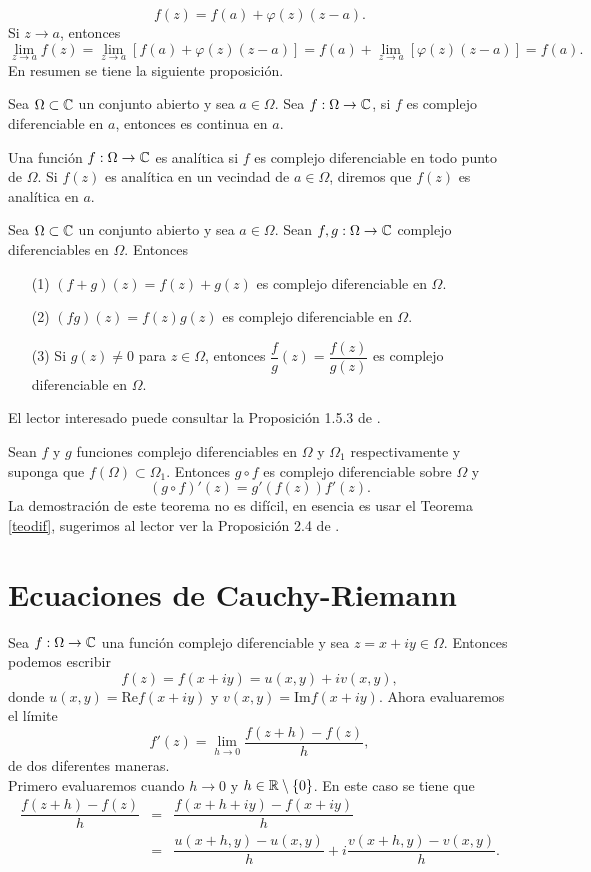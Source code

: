$$f(z)=f(a)+\varphi(z)(z-a).$$
Si $z\rightarrow a$, entonces 
$$\lim_{z\rightarrow a}f(z)=\lim_{z\rightarrow a}\left[f(a)+\varphi(z)(z-a)\right]=f(a)+\lim_{z\rightarrow a}[\varphi(z)(z-a)]=f(a).$$
En resumen se tiene la siguiente proposición.
\begin{prop}
	Sea $\Omega\subset \mathbb{C}$ un conjunto abierto y sea $a \in \Omega$. Sea $f:\Omega\rightarrow\mathbb{C}$, si $f$ es complejo diferenciable en $a$, entonces es continua en $a$.
\end{prop}
\begin{defi}
	Una función $f:\Omega\rightarrow\mathbb{C}$ es analítica si $f$ es complejo diferenciable en todo punto de  $\Omega$. Si $f(z)$ es analítica en un vecindad de $a\in \Omega$, diremos que $f(z)$ es analítica en $a$.
\end{defi}

\begin{prop}
	Sea $\Omega\subset \mathbb{C}$ un conjunto abierto y sea $a \in \Omega$. Sean $f,g:\Omega\rightarrow\mathbb{C}$ complejo diferenciables en $\Omega$. Entonces 
	\begin{itemize}
		\item [(1)] $(f+g)(z)=f(z)+g(z)$ es complejo diferenciable en $\Omega$.
		\item [(2)] $(fg)(z)=f(z)g(z)$ es complejo diferenciable en $\Omega$.
		\item [(3)] Si $g(z)\neq 0$ para $z\in\Omega$, entonces $\dfrac{f}{g}(z) = \dfrac{f(z)}{g(z)}$ es complejo diferenciable en $\Omega$.
	\end{itemize} 
\end{prop}
El lector interesado puede consultar la Proposición 1.5.3 de \cite{marsden}. 
\begin{teor}
	Sean $f$ y $g$ funciones complejo diferenciables en $\Omega$ y $\Omega_{1}$ respectivamente y suponga que $f(\Omega)\subset\Omega_{1}$. Entonces $g\circ f$ es complejo diferenciable sobre $\Omega$ y 
	$$(g\circ f)'(z)=g'(f(z))f'(z).$$
	La demostración de este teorema no es difícil, en esencia es usar el Teorema \ref{teodif}, sugerimos al lector ver la Proposición 2.4 de \cite{Conway}.


\end{teor}
\section{Ecuaciones de Cauchy-Riemann} \label{sec:Cauchy-Riemann}

Sea $f:\Omega\rightarrow\mathbb{C}$ una función complejo diferenciable y sea $z=x+iy\in \Omega$. Entonces podemos escribir
$$f(z)=f(x+iy)=u(x,y)+iv(x,y),$$
donde $u(x,y)=\mathrm{Re } f(x+iy)$ y $v(x,y)=\mathrm{Im } f(x+iy)$. Ahora evaluaremos el límite 
$$f'(z)=\lim_{h\rightarrow 0}\dfrac{f(z+h)-f(z)}{h},$$
de dos diferentes maneras.\\
Primero evaluaremos cuando $h\rightarrow 0$ y $h\in \mathbb{R}\setminus\{0\}$. En este caso  se tiene que
\[
\begin{array}{ccl}
	\dfrac{f(z+h)-f(z)}{h}&=&\dfrac{f(x+h+iy)-f(x+iy)}{h}\\
	&=&\dfrac{u(x+h,y)-u(x,y)}{h}+i\dfrac{v(x+h,y)-v(x,y)}{h}.
\end{array}
\]

